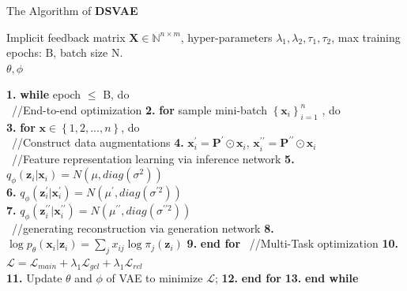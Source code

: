 \begin{algorithm}[t]
	\caption{The Algorithm of \textbf{DSVAE}}
	\begin{algorithmic}
		\label{Algorithm one}
		 Implicit feedback matrix $\mathbf{X}\in\mathbb{N}^{n\times m}$, hyper-parameters $\lambda_1, \lambda_2, \tau_1, \tau_2$, max training epochs: B, batch size N.\\
		 $\theta, \phi$

		\STATE \textbf{1.}  \textbf{while} {epoch $\leq$ B}, do\\
	    \STATE\ \quad //End-to-end optimization
	    \STATE \textbf{2.}  \quad \textbf{for} {sample mini-batch $\left\{\mathbf{x}_i\right\}_{i=1}^n$ }, do\\
		
		\STATE \textbf{3.}  \quad \quad  \textbf{for} {$\mathbf{x}\in\left\{1,2,...,n\right\}$}, do\\
		 \STATE\ \quad //Construct data augmentations
		\STATE \textbf{4.}  \quad \quad \quad $\mathbf{x}_i^{\prime} = \mathbf{P^{\prime}} \odot \mathbf{x}_i\text{,  } \mathbf{x}_i^{\prime\prime} = \mathbf{P^{\prime\prime}} \odot \mathbf{x}_i$\\
		\STATE\ \quad //Feature representation learning via inference network
		\STATE \textbf{5.}   \quad \quad \quad $q_\phi(\mathbf{z}_i\lvert\mathbf{x}_i)= N(\mu,diag(\sigma^{2}))$\\
		\STATE \textbf{6.}  \quad \quad \quad $q_\phi(\mathbf{z}_i^{\prime}\lvert\mathbf{x}_i^{\prime})= N(\mu^{\prime},diag(\sigma^{\prime 2}))$\\
		\STATE \textbf{7.} \quad \quad \quad $q_\phi(\mathbf{z}_i^{\prime\prime}\lvert\mathbf{x}_i^{\prime\prime})= N(\mu^{\prime\prime},diag(\sigma^{\prime\prime 2}))$\\
		 \STATE\ \quad //generating reconstruction via generation network
		\STATE \textbf{8.}  \quad\quad \quad $\log{p_{\theta} { \left( \mathbf{x}_i \lvert\mathbf{z}_i\right)}}=\sum_{j}{x_{ij}\log{\pi_{j}\left( \mathbf{z}_i \right) }}$
		\STATE \textbf{9.}  \quad \quad \textbf{end for}
		\STATE\ \quad //Multi-Task optimization
		\STATE \textbf{10.}  \quad  \quad  $\mathcal{L} = \mathcal{L}_{main} + \lambda_1 \mathcal{L}_{gcl} + \lambda_1 \mathcal{L}_{rcl}$\\
		\STATE \textbf{11.} \quad  \quad Update $\theta$ and $\phi$ of VAE to minimize $\mathcal{L}$;
		\STATE \textbf{12.} \quad \textbf{end for}
		\STATE \textbf{13.} \textbf{end while}
	\end{algorithmic}
\end{algorithm}


